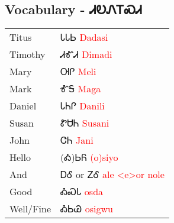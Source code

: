 \subsection{Vocabulary - ᏗᎧᏁᎢᏍᏗ 
}
\begin{tabular}{p{3cm} p{11cm}}
Titus & ᏓᏓᏏ 
 \newline \textcolor{red}{Dadasi}\\
Timothy & ᏗᎹᏗ 
 \newline \textcolor{red}{Dimadi}\\
Mary & ᎺᎵ 
 \newline \textcolor{red}{Meli}\\
Mark & ᎹᎦ 
 \newline \textcolor{red}{Maga}\\
Daniel & ᏓᏂᎵ 
 \newline \textcolor{red}{Danili}\\
Susan & ᏑᏌᏂ 
 \newline \textcolor{red}{Susani}\\
John & ᏣᏂ 
 \newline \textcolor{red}{Jani}\\
Hello & (Ꭳ)ᏏᏲ 
 \newline \textcolor{red}{(o)siyo}\\
And & ᎠᎴ 
  or ᏃᎴ 
 \newline \textcolor{red}{ale <e>or nole}\\
Good & ᎣᏍᏓ 
 \newline \textcolor{red}{osda}\\
Well/Fine & ᎣᏏᏊ 
 \newline \textcolor{red}{osigwu}\\
\end{tabular}

